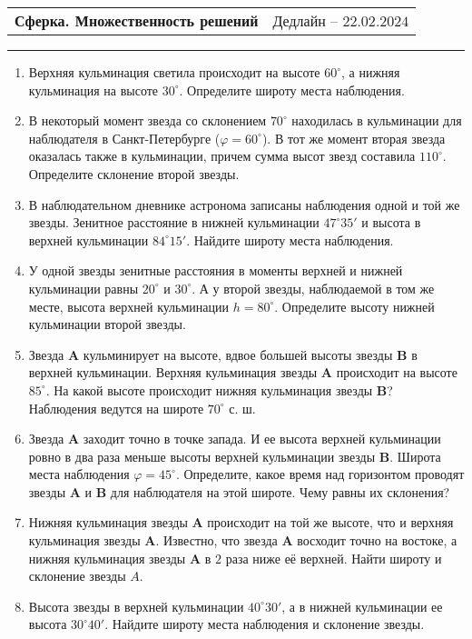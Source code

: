 \documentclass[12pt]{article}
\begin{document}
 \begin{tabularx}{\textwidth}{Xr}
  {\Large \textbf{Сферка. Множественность решений}} & Дедлайн -- $22.02.2024$ \\
 \end{tabularx}
 \noindent\rule{\textwidth}{0.4pt}
 \begin{enumerate}
        \item Верхняя кульминация светила происходит на высоте $60^{\circ}$, а нижняя кульминация на высоте $30^{\circ}$. Определите широту места наблюдения.
        \item В некоторый момент звезда со склонением $70^{\circ}$ находилась в кульминации для наблюдателя в Санкт-Петербурге ($\varphi=60^{\circ}$). В тот же момент вторая звезда оказалась также в кульминации, причем сумма высот звезд составила $110^{\circ}$. Определите склонение второй звезды.
        \item В наблюдательном дневнике астронома записаны наблюдения одной и той же звезды. Зенитное расстояние в нижней кульминации $47^{\circ}35'$ и высота в верхней кульминации $84^{\circ}15'$. Найдите широту места наблюдения.
        \item У одной звезды зенитные расстояния в моменты верхней и нижней кульминации равны $20^{\circ}$ и $30^{\circ}$. А у второй звезды, наблюдаемой в том же месте, высота верхней кульминации $h=80^{\circ}$. Определите высоту нижней кульминации второй звезды.
        \item Звезда \textbf{A} кульминирует на высоте, вдвое большей высоты звезды \textbf{B} в верхней кульминации. Верхняя кульминация звезды \textbf{A} происходит на высоте $85^{\circ}$. На какой высоте происходит нижняя  кульминация звезды \textbf{B}? Наблюдения ведутся на широте $70^{\circ}$ с. ш.
        \item Звезда \textbf{A} заходит точно в точке запада. И ее высота верхней кульминации ровно в два раза меньше высоты верхней кульминации звезды \textbf{B}. Широта места наблюдения $\varphi=45^{\circ}$. Определите, какое время над горизонтом проводят звезды \textbf{A} и \textbf{B} для наблюдателя на этой широте. Чему равны их склонения?
        \item Нижняя кульминация звезды \textbf{A} происходит на той же высоте, что и верхняя кульминация звезды \textbf{A}. Известно, что звезда \textbf{A} восходит точно на востоке, а нижняя кульминация звезды \textbf{A} в $2$ раза ниже её верхней. Найти широту и склонение звезды $A$.
        \item Высота звезды в верхней кульминации $40^{\circ}30'$, а в нижней кульминации ее высота $30^{\circ}40'$. Найдите широту места наблюдения и склонение звезды.

\end{enumerate}
\end{document}
